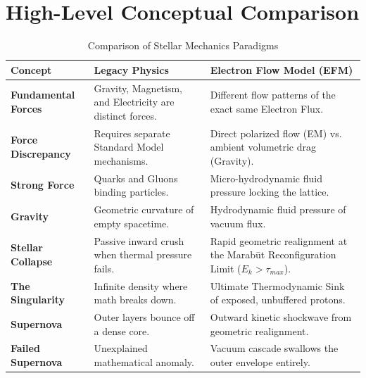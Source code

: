 \documentclass[11pt, a4paper]{article}
\begin{document}
\section{High-Level Conceptual Comparison}
  \begin{table}[H]
    \centering
    \renewcommand{\arraystretch}{1.5}
    \begin{tabularx}{\textwidth}{>{\raggedright\arraybackslash}p{3.5cm} >{\raggedright\arraybackslash}X >{\raggedright\arraybackslash}X}
      \toprule
      \textbf{Concept} & \textbf{Legacy Physics} & \textbf{Electron Flow Model (EFM)} \\
      \midrule
      \textbf{Fundamental Forces} & Gravity, Magnetism, and Electricity are distinct forces. & Different flow patterns of the exact same Electron Flux. \\
      \textbf{Force Discrepancy} & Requires separate Standard Model mechanisms. & Direct polarized flow (EM) vs. ambient volumetric drag (Gravity). \\
      \textbf{Strong Force} & Quarks and Gluons binding particles. & Micro-hydrodynamic fluid pressure locking the lattice. \\
      \textbf{Gravity} & Geometric curvature of empty spacetime. & Hydrodynamic fluid pressure of vacuum flux. \\
      \textbf{Stellar Collapse} & Passive inward crush when thermal pressure fails. & Rapid geometric realignment at the Marab\={u}t Reconfiguration Limit ($E_k > \tau_{max}$). \\
      \textbf{The Singularity} & Infinite density where math breaks down. & Ultimate Thermodynamic Sink of exposed, unbuffered protons. \\
      \textbf{Supernova} & Outer layers bounce off a dense core. & Outward kinetic shockwave from geometric realignment. \\
      \textbf{Failed Supernova} & Unexplained mathematical anomaly. & Vacuum cascade swallows the outer envelope entirely. \\
      \bottomrule
    \end{tabularx}
    \caption{Comparison of Stellar Mechanics Paradigms}
    \label{tab:comparison}
  \end{table}

\end{document}
